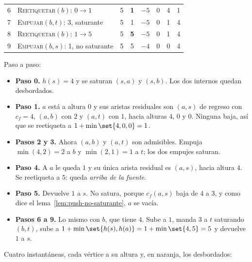 \documentclass[11pt,letterpaper]{article}
\begin{document}
\begin{ejemplo}
\begin{center}
\begin{tabular}{rlcccccc}
    6 & \textsc{Reetiquetar}$(b)$: $0 \to 1$ & 5 & \textbf{1}
      & $-5$ & 0 & 4 & 1 \\
    7 & \textsc{Empujar}$(b, t)$: 3, saturante & 5 & 1
      & $-5$ & 0 & 1 & 4 \\
    8 & \textsc{Reetiquetar}$(b)$: $1 \to 5$ & 5 & \textbf{5}
      & $-5$ & 0 & 1 & 4 \\
    9 & \textsc{Empujar}$(b, s)$: 1, no saturante & 5 & 5
      & $-4$ & 0 & 0 & 4 \\
    \bottomrule
  \end{tabular}
  \end{center}
  Paso a paso:
  \begin{itemize}
    \item \textbf{Paso 0.} $h(s) = 4$ y se saturan $(s, a)$ y
          $(s, b)$. Los dos internos quedan desbordados.
    \item \textbf{Paso 1.} $a$ está a altura $0$ y sus aristas
          residuales son $(a, s)$ de regreso con $c_f = 4$, $(a, b)$
          con $2$ y $(a, t)$ con $1$, hacia alturas $4$, $0$ y $0$.
          Ninguna baja, así que se reetiqueta a
          $1 + \min\set{4, 0, 0} = 1$.
    \item \textbf{Pasos 2 y 3.} Ahora $(a, b)$ y $(a, t)$ son
          admisibles. Empuja $\min(4, 2) = 2$ a $b$ y $\min(2, 1) = 1$
          a $t$; los dos empujes saturan.
    \item \textbf{Paso 4.} A $a$ le queda $1$ y su única arista
          residual es $(a, s)$, hacia altura $4$. Se reetiqueta a $5$:
          queda \emph{arriba de la fuente}.
    \item \textbf{Paso 5.} Devuelve $1$ a $s$. No satura, porque
          $c_f(a, s)$ baja de $4$ a $3$, y como dice el
          lema~\ref{lem:push-no-saturante}, $a$ se vacía.
    \item \textbf{Pasos 6 a 9.} Lo mismo con $b$, que tiene $4$. Sube a
          $1$, manda $3$ a $t$ saturando $(b, t)$, sube a
          $1 + \min\set{h(s), h(a)} = 1 + \min\set{4, 5} = 5$ y
          devuelve $1$ a $s$.
  \end{itemize}
  Cuatro instantáneas, cada vértice a su altura y, en naranja, los
  desbordados:
  \begin{center}
\end{center}
\end{ejemplo}
\end{document}
